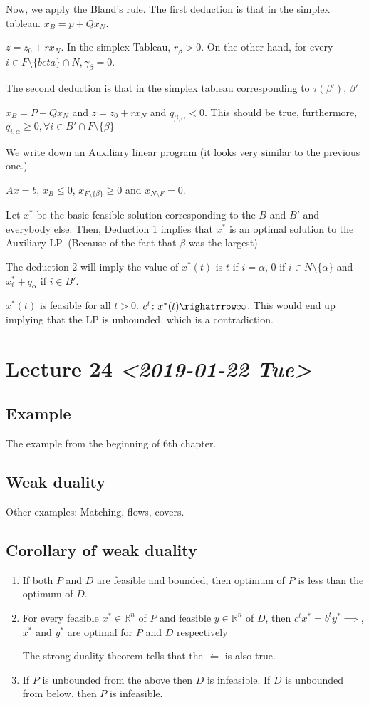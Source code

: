 \documentclass[11pt]{article}
\def\R{\mathbb{R}}
\begin{document}
Now, we apply the Bland's rule. The first deduction is that in the simplex
tableau. \(x_B = p + Q x_N\).

\(z = z_0 + r x_N\). In the simplex Tableau, \(r_\beta > 0\). On the other hand,
for every \(i \in F \setminus \{beta\} \cap N, \gamma_\beta = 0\).

The second deduction is that in the simplex tableau corresponding to
\(\tau(\beta')\), \(\beta'\)

\(x_B = P + Q x_N\) and \(z = z_0 + r x_N\) and \(q_{\beta, \alpha} < 0\). This
should be true, furthermore, \(q_{i, \alpha} \ge 0, \forall i \in B' \cap F
   \setminus \{\beta\}\)

We write down an Auxiliary linear program (it looks very similar to the
previous one.)

\(Ax = b\), \(x_B \le 0\), \(x_{F \setminus \{\beta\}} \ge 0\) and \(x_{N \setminus
   F} = 0\).

Let \(x^{ * }\) be the basic feasible solution corresponding to the \(B\) and \(B'\)
and everybody else. Then, Deduction 1 implies that \(x^{ * }\) is an optimal
solution to the Auxiliary LP. (Because of the fact that \(\beta\) was the largest)

The deduction \(2\) will imply the value of \(x^{ * }(t)\) is \(t\) if \(i =
   \alpha\), \(0\) if \(i \in N \setminus \{\alpha\}\) and \(x_{i}^{ * } + q_{\alpha}\)
if \(i \in B'\).

\(x^{*}(t)\) is feasible for all \(t > 0\). \(c^{t} \colon x^{ * }(t) \righatrrow
   \infty\). This would end up implying that the LP is unbounded, which is a
contradiction.
\section{Lecture 24 \textit{<2019-01-22 Tue>}}
\label{sec:org7cda63f}
\subsection{Example}
\label{sec:orgccf69fa}
The example from the beginning of 6th chapter.
\subsection{Weak duality}
\label{sec:org42fc85c}
Other examples: Matching, flows, covers.
\subsection{Corollary of weak duality}
\label{sec:org448bfbf}
\begin{enumerate}
\item If both \(P\) and \(D\) are feasible and bounded, then optimum of \(P\) is less
than the optimum of \(D\).
\item For every feasible \(x^{*} \in \R^n\) of \(P\) and feasible \(y \in \R^n\) of
\(D\), then \(c^{t} x^{ * } = b^t y^{ * } \implies\), \(x^{ * }\) and \(y^{ * }\)
are optimal for \(P\) and \(D\) respectively

The strong duality theorem tells that the \(\Leftarrow\) is also true.
\item If \(P\) is unbounded from the above then \(D\) is infeasible. If \(D\) is
unbounded from below, then \(P\) is infeasible.
\end{enumerate}
\end{document}

